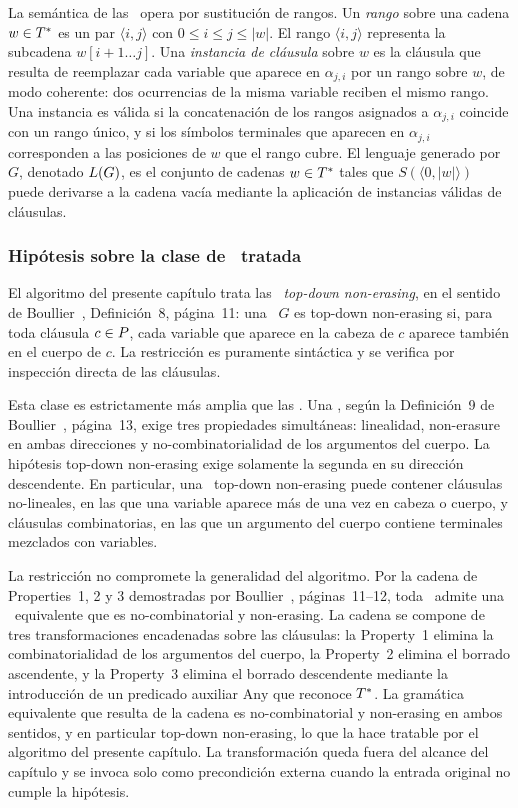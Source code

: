 La semántica de las \PRCG\ opera por sustitución de rangos. Un \emph{rango} sobre una cadena $w \in T^{*}$ es un par $\langle i, j \rangle$ con $0 \leq i \leq j \leq \lvert w \rvert$. El rango $\langle i, j \rangle$ representa la subcadena $w[i+1 \ldots j]$. Una \emph{instancia de cláusula} sobre $w$ es la cláusula que resulta de reemplazar cada variable que aparece en $\alpha_{j,i}$ por un rango sobre $w$, de modo coherente: dos ocurrencias de la misma variable reciben el mismo rango. Una instancia es válida si la concatenación de los rangos asignados a $\alpha_{j,i}$ coincide con un rango único, y si los símbolos terminales que aparecen en $\alpha_{j,i}$ corresponden a las posiciones de $w$ que el rango cubre. El lenguaje generado por $G$, denotado $L(G)$, es el conjunto de cadenas $w \in T^{*}$ tales que $S(\langle 0, \lvert w \rvert \rangle)$ puede derivarse a la cadena vacía mediante la aplicación de instancias válidas de cláusulas.

\subsubsection{Hipótesis sobre la clase de \PRCG\ tratada}\label{sec:hipotesis}

El algoritmo del presente capítulo trata las \PRCG\ \emph{top-down non-erasing}, en el sentido de Boullier~\cite{REF}, Definición~8, página~11: una \PRCG\ $G$ es top-down non-erasing si, para toda cláusula $c \in P$, cada variable que aparece en la cabeza de $c$ aparece también en el cuerpo de $c$. La restricción es puramente sintáctica y se verifica por inspección directa de las cláusulas.

Esta clase es estrictamente más amplia que las \sRCG. Una \sRCG, según la Definición~9 de Boullier~\cite{REF}, página~13, exige tres propiedades simultáneas: linealidad, non-erasure en ambas direcciones y no-combinatorialidad de los argumentos del cuerpo. La hipótesis top-down non-erasing exige solamente la segunda en su dirección descendente. En particular, una \PRCG\ top-down non-erasing puede contener cláusulas no-lineales, en las que una variable aparece más de una vez en cabeza o cuerpo, y cláusulas combinatorias, en las que un argumento del cuerpo contiene terminales mezclados con variables.

La restricción no compromete la generalidad del algoritmo. Por la cadena de Properties~1, 2 y 3 demostradas por Boullier~\cite{REF}, páginas~11--12, toda \PRCG\ admite una \PRCG\ equivalente que es no-combinatorial y non-erasing. La cadena se compone de tres transformaciones encadenadas sobre las cláusulas: la Property~1 elimina la combinatorialidad de los argumentos del cuerpo, la Property~2 elimina el borrado ascendente, y la Property~3 elimina el borrado descendente mediante la introducción de un predicado auxiliar $\mathrm{Any}$ que reconoce $T^{*}$. La gramática equivalente que resulta de la cadena es no-combinatorial y non-erasing en ambos sentidos, y en particular top-down non-erasing, lo que la hace tratable por el algoritmo del presente capítulo. La transformación queda fuera del alcance del capítulo y se invoca solo como precondición externa cuando la entrada original no cumple la hipótesis.

